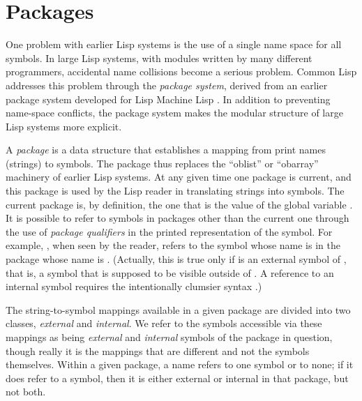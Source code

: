 
\clearpage\def\pagestatus{ULTIMATE}

\ifx \rulang\Undef

\chapter{Packages}
\label{XPACK}

One problem with earlier Lisp systems is the use of a single name space
for all symbols.  In large Lisp systems, with modules written by many
different programmers, accidental name collisions become a serious
problem.  Common Lisp addresses this problem through the \emph{package system},
derived from an earlier package system developed for
Lisp Machine Lisp \cite{BLUE-LISPM}.
In addition to preventing name-space conflicts, the
package system makes the modular structure of large Lisp systems more
explicit.

A \emph{package} is a data structure that establishes a mapping from print
names (strings) to symbols.  The package thus replaces the ``oblist'' or
``obarray'' machinery of earlier Lisp systems.  At any given time one
package is current, and this package is used by the Lisp reader in
translating strings into symbols.  The current package is, by definition,
the one that is the
value of the global variable .  It is possible to refer to
symbols in packages other than the current one through the use of
\emph{package qualifiers} in the printed representation of the symbol.
For example, , when seen by the reader,
refers to the symbol whose name is
 in the package whose name is .
(Actually, this is true only if  is an external symbol of ,
that is, a symbol that is supposed to be visible outside of .
A reference to an internal symbol requires the intentionally
clumsier syntax .)

The string-to-symbol mappings available in a given package are divided
into two classes, \emph{external} and \emph{internal}.  We refer to the
symbols accessible via these mappings as being \emph{external} and
\emph{internal} symbols of the package in question, though really it is the
mappings that are different and not the symbols themselves.  Within a
given package, a name refers to one symbol or to none; if it does refer
to a symbol, then it is either external or internal in that
package, but not both.

